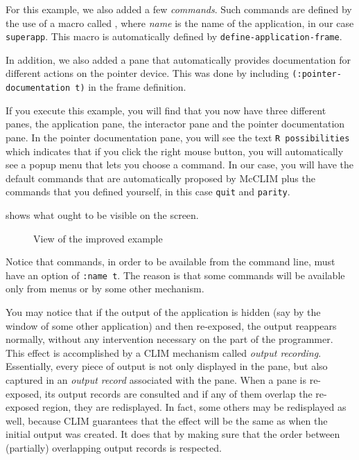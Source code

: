 For this example, we also added a few \emph{commands}.  Such
commands are defined by the use of a macro called
, where
\textit{name} is the name of the application, in our case
\texttt{superapp}. This macro is automatically defined by
\texttt{define-application-frame}.

In addition, we also added a pane that automatically provides documentation for
different actions on the pointer device. This was done by
including \texttt{(:pointer-documentation t)} in the frame definition.

If you execute this example, you will find that you now have three
different panes, the application pane, the interactor pane and the
pointer documentation pane.  In the pointer documentation pane, you
will see the text \texttt{R possibilities} which indicates that if you
click the right mouse button, you will automatically see a popup menu
that lets you choose a command.  In our case, you will have the
default commands that are automatically proposed by McCLIM plus the
commands that you defined yourself, in this case \texttt{quit} and
\texttt{parity}.

 shows what ought to be visible on the screen.

\begin{figure}
\begin{center}
\end{center}
\caption{\label{ex2} View of the improved example}
\end{figure}

Notice that commands, in order to be available from the command line,
must have an option of \texttt{:name t}.  The reason is that some
commands will be available only from menus or by some other mechanism.

You may notice that if the output of the application is hidden (say by
the window of some other application) and then re-exposed, the output
reappears normally, without any intervention necessary on the part of
the programmer.  This effect is accomplished by a CLIM mechanism
called \emph{output recording}.  Essentially, every piece of output is
not only displayed in the pane, but also captured in an \emph{output
  record} associated with the pane.  When a pane is re-exposed, its
output records are consulted and if any of them overlap the re-exposed
region, they are redisplayed.  In fact, some others may be redisplayed
as well, because CLIM guarantees that the effect will be the same as
when the initial output was created.  It does that by making sure that
the order between (partially) overlapping output records is respected.

